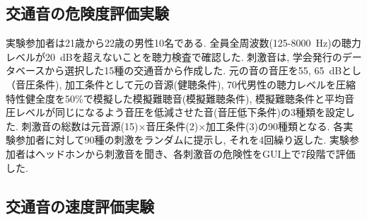 \documentclass[10pt,twocolumn,uplatex,dvipdfmx]{jsarticle} %
\begin{document}
\subsection{交通音の危険度評価実験}\label{danger_Exp}


実験参加者は21歳から22歳の男性10名である. 全員全周波数(125-8000~Hz)の聴力レベルが20~dBを超えないことを聴力検査で確認した.  刺激音は, 学会発行のデータベース\cite{日本建築学会2004建築と環境のサウンドライブラリ}から選択した15種の交通音から作成した. 元の音の音圧を55, 65~dBとし（音圧条件), 加工条件として元の音源(健聴条件), 70代男性の聴力レベル\cite{iso1984acoustics}を圧縮特性健全度を50\%で模擬した模擬難聴音(模擬難聴条件), 模擬難聴条件と平均音圧レベルが同じになるよう音圧を低減させた音(音圧低下条件)の3種類を設定した.
刺激音の総数は元音源(15)×音圧条件(2)×加工条件(3)の90種類となる. 各実験参加者に対して90種の刺激をランダムに提示し, それを4回繰り返した. 実験参加者はヘッドホンから刺激音を聞き、各刺激音の危険性をGUI上で7段階で評価した.

\subsection{交通音の速度評価実験}
\end{document}
